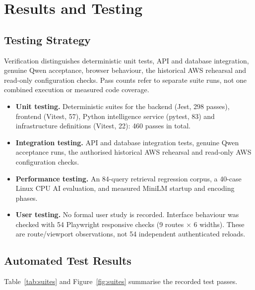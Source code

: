 \chapter{Results and Testing}
\label{ch:results}

\section{Testing Strategy}

Verification distinguishes deterministic unit tests, API and database integration, genuine Qwen acceptance, browser behaviour, the historical AWS rehearsal and read-only configuration checks. Pass counts refer to separate suite runs, not one combined execution or measured code coverage.

\begin{itemize}
  \item \textbf{Unit testing.} Deterministic suites for the backend (Jest, 298 passes), frontend (Vitest, 57), Python intelligence service (pytest, 83) and infrastructure definitions (Vitest, 22): 460 passes in total.
  \item \textbf{Integration testing.} API and database integration tests, genuine Qwen acceptance runs, the authorised historical AWS rehearsal and read-only AWS configuration checks.
  \item \textbf{Performance testing.} An 84-query retrieval regression corpus, a 40-case Linux CPU AI evaluation, and measured MiniLM startup and encoding phases.
  \item \textbf{User testing.} No formal user study is recorded. Interface behaviour was checked with 54 Playwright responsive checks (9 routes $\times$ 6 widths). These are route/viewport observations, not 54 independent authenticated reloads.
\end{itemize}

\section{Automated Test Results}

Table~\ref{tab:suites} and Figure~\ref{fig:suites} summarise the recorded test passes.

